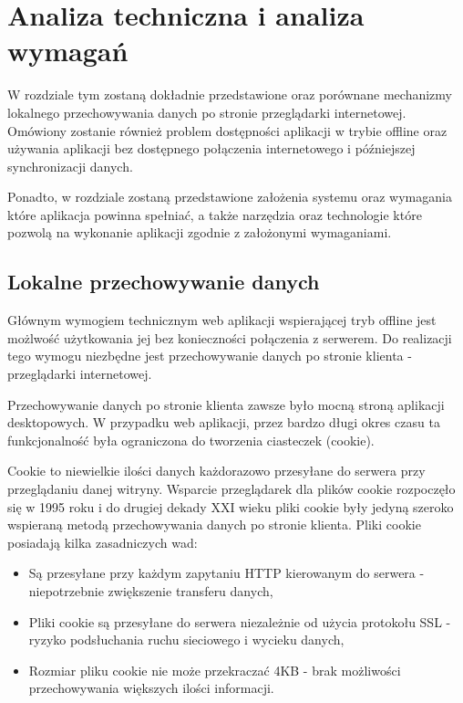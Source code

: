\chapter{Analiza techniczna i analiza wymagań}
\label{cha:anaTechIAnaWym}

W rozdziale tym zostaną dokładnie przedstawione oraz porównane mechanizmy lokalnego przechowywania danych po stronie przeglądarki internetowej. Omówiony zostanie również problem dostępności aplikacji w trybie offline oraz używania aplikacji bez dostępnego połączenia internetowego i późniejszej synchronizacji danych.

Ponadto, w rozdziale zostaną przedstawione założenia systemu oraz wymagania które aplikacja powinna spełniać, a także narzędzia oraz technologie które pozwolą na wykonanie aplikacji zgodnie z założonymi wymaganiami.

\section{Lokalne przechowywanie danych}
\label{sec:lokPrzechDanych}

Głównym wymogiem technicznym web aplikacji wspierającej tryb offline jest możlwość użytkowania jej bez konieczności połączenia z serwerem. Do realizacji tego wymogu niezbędne jest przechowywanie danych po stronie klienta - przeglądarki internetowej.

Przechowywanie danych po stronie klienta zawsze było mocną stroną aplikacji desktopowych. W przypadku web aplikacji, przez bardzo długi okres czasu ta funkcjonalność była ograniczona do tworzenia ciasteczek (cookie).

Cookie to niewielkie ilości danych każdorazowo przesyłane do serwera przy przeglądaniu danej witryny. Wsparcie przeglądarek dla plików cookie rozpoczęło się w 1995 roku i do drugiej dekady XXI wieku pliki cookie były jedyną szeroko wspieraną metodą przechowywania danych po stronie klienta. Pliki cookie posiadają kilka zasadniczych wad:


\begin{itemize}
\item Są przesyłane przy każdym zapytaniu HTTP kierowanym do serwera - niepotrzebnie zwiększenie transferu danych,
\item Pliki cookie są przesyłane do serwera niezależnie od użycia protokołu SSL - ryzyko podsłuchania ruchu sieciowego i wycieku danych,
\item Rozmiar pliku cookie nie może przekraczać 4KB - brak możliwości przechowywania większych ilości informacji.
\end{itemize}

